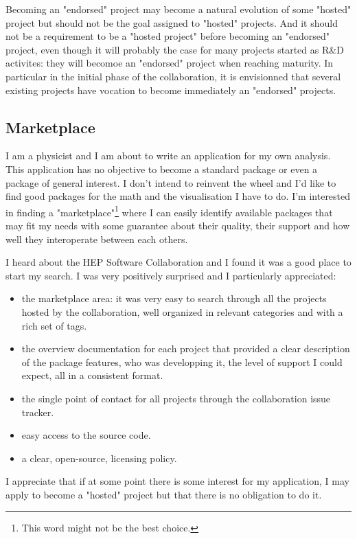 \documentclass[11pt]{article} %
\begin{document}
Becoming an "endorsed" project may become a natural evolution of some "hosted" project but should not be the goal assigned to "hosted" projects. And
it should not be a requirement to be a "hosted project" before becoming an "endorsed" project, even though it will probably the case for many projects
started as R\&D activites: they will becomoe an "endorsed" project when reaching maturity. In particular in the initial phase of the collaboration,
it is envisionned that several existing projects have vocation to become immediately an "endorsed" projects.

\subsection{Marketplace}

I am a physicist and I am about to write an application for my own analysis. This application has no objective to become a standard
package or even a package of general interest. I don't intend to reinvent the wheel and I'd like to find good
packages for the math and the visualisation I have to do. I'm interested in finding a "marketplace"\footnote{This word might not be the best choice.}
where I can easily identify available packages that may fit my needs with some guarantee about their quality,
their support and how well they interoperate between each others.

I heard about the HEP Software Collaboration and I found it was a good place to start my search.
I was very positively surprised and I particularly appreciated:
\begin{itemize}
\item the marketplace area: it was very easy to search through all the projects hosted by the collaboration, well organized
in relevant categories and with a rich set of tags.
\item the overview documentation for each project that provided a clear description of the package features, who was
developping it, the level of support I could expect, all in a consistent format.
\item the single point of contact for all projects through the collaboration issue tracker.
\item easy access to the source code.
\item a clear, open-source, licensing policy.
\end{itemize}

I appreciate that if at some point there is some interest for my application, I may apply to become a "hosted" project but that there is no obligation to do it.
\end{document}

